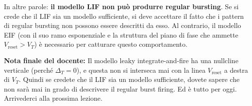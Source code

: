 In altre parole: \textbf{il modello LIF non può produrre regular bursting}. Se si crede che il LIF sia un modello sufficiente, si deve accettare il fatto che i pattern di regular bursting non possono essere descritti da esso. Al contrario, il modello EIF (con il suo ramo esponenziale e la struttura del piano di fase che ammette $V_{\text{reset}} > V_T$) è necessario per catturare questo comportamento.

\begin{tcolorbox}[colback=gray!5, colframe=gray!40, arc=2mm, boxrule=0.5pt]
\textbf{Nota finale del docente:} Il modello leaky integrate-and-fire ha una nullcline verticale (perché $\Delta_T = 0$), e questa non si interseca mai con la linea $V_{\text{reset}}$ a destra di $V_T$. Quindi se credete che il LIF sia un modello sufficiente, dovete sapere che non sarà mai in grado di descrivere il regular burst firing. Ed è tutto per oggi. Arrivederci alla prossima lezione.
\end{tcolorbox}

